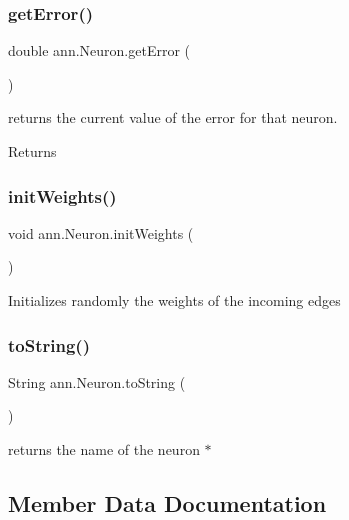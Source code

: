 \subsubsection{\texorpdfstring{get\+Error()}{getError()}}
{\footnotesize\ttfamily double ann.\+Neuron.\+get\+Error (\begin{DoxyParamCaption}{ }\end{DoxyParamCaption})}

returns the current value of the error for that neuron. \begin{DoxyReturn}{Returns}

\end{DoxyReturn}
\mbox{\label{classann_1_1_neuron_aa1544b3c4a7e5a002eef88277126d4f5}} 
\subsubsection{\texorpdfstring{init\+Weights()}{initWeights()}}
{\footnotesize\ttfamily void ann.\+Neuron.\+init\+Weights (\begin{DoxyParamCaption}{ }\end{DoxyParamCaption})}

Initializes randomly the weights of the incoming edges \mbox{\label{classann_1_1_neuron_a22d903dc7a9e7693b77c3b407359a78a}} 
\subsubsection{\texorpdfstring{to\+String()}{toString()}}
{\footnotesize\ttfamily String ann.\+Neuron.\+to\+String (\begin{DoxyParamCaption}{ }\end{DoxyParamCaption})}

returns the name of the neuron $\ast$ 

\subsection{Member Data Documentation}
\mbox{\label{classann_1_1_neuron_a68c3c65ea538d533aae8a343b043d921}} 
